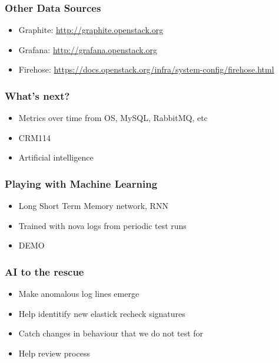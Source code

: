 \documentclass[aspectratio=169,11pt,hyperref={colorlinks=true}]{beamer}
\begin{document}

\begin{frame}
    \frametitle{Other Data Sources}
    \begin{itemize}
        \item{Graphite: \href{http://graphite.openstack.org}{http://graphite.openstack.org}}
        \item{Grafana: \href{http://grafana.openstack.org}{http://grafana.openstack.org}}
        \item{Firehose: \href{https://docs.openstack.org/infra/system-config/firehose.html}{https://docs.openstack.org/infra/system-config/firehose.html}}
    \end{itemize}
\end{frame}


\begin{frame}
    \frametitle{What's next?}
    \begin{itemize}
        \item{Metrics over time from OS, MySQL, RabbitMQ, etc}
        \item{CRM114}
        \item{Artificial intelligence}
    \end{itemize}
\end{frame}


\begin{frame}
    \frametitle{Playing with Machine Learning}
    \begin{itemize}
        \item{Long Short Term Memory network, RNN}
        \item{Trained with nova logs from periodic test runs}
    \end{itemize}
    \begin{itemize}
        \item{DEMO}
    \end{itemize}
\end{frame}

\begin{frame}
    \frametitle{AI to the rescue}
    \begin{itemize}
        \item{Make anomalous log lines emerge}
    \end{itemize}
    \begin{itemize}
        \item{Help identitify new elastick recheck signatures}
        \item{Catch changes in behaviour that we do not test for}
        \item{Help review process}
    \end{itemize}
\end{frame}
\end{document}
